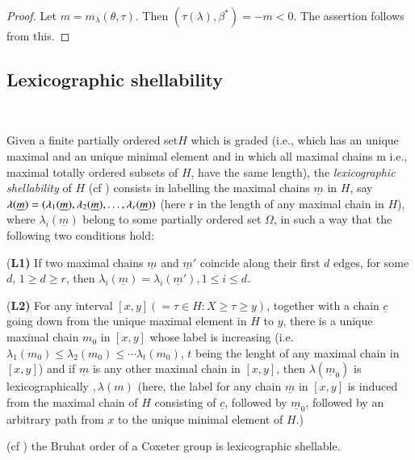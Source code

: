 \begin{proof}
Let $m=m_{\lambda}(\theta,\tau)$. Then $(\tau(\lambda), \beta^{*})= -m < 0$. The assertion follows from this.
\end{proof}

\setcounter{subsection}{5}
\subsection{Lexicographic shellability}\label{chap9-subsec-2.6}
~

\medskip
\noindent
Given a finite partially ordered set$H$ which is graded (i.e., which has an unique maximal and an unique minimal element and in which all maximal chains m i.e., maximal totally ordered subsets of $H$, have the same length), the
\textit{lexicographic shellability} of $H$ (cf \cite{chap9-keyB-W}) consists in labelling the maximal chains $\underline{m}$ in $H$, say $\lambda(\underline{m})= (\lambda_{1}(\underline{m}), \lambda_{2}(\underline{m}), \ldots, \break \lambda_{r}(\underline{m}))$ (here r in the length of any maximal chain in $H$), where $\lambda_{i}(\underline{m})$ belong to some partially ordered set $\Omega$, in such a way that the following two conditions hold:

\noindent
{(\bf L1)} If two maximal chains $\underline{m}$ and $\underline{m}'$ coincide along their first $d$ edges, for some $d$, $1 \geq d \geq r$, then $\lambda_{i}(\underline{m})= \lambda_{i}(\underline{m}'), 1 \leq i \leq d$.

\noindent
{(\bf L2)} For any interval $[x,y](= \tau \in H : X\geq \tau \geq y)$, together with a chain $\underline{c}$ going down from the unique maximal element in $H$ to $y$, there is a unique maximal chain $m_{0}$ in $[x,y]$ whose label is increasing (i.e. $\lambda_{1}(m_{0})\leq \lambda_{2}(m_{0})\leq \cdots \lambda_{t}(m_{0})$, $t$ being the lenght of any maximal chain in $[x,y]$) and if $\underline{m}$ is any other maximal chain in $[x,y]$, then $\lambda(\underline{m}_{0})$ is lexicographically $, \lambda(m)$ (here, the label for any chain $\underline{m}$ in $[x,y]$ is induced from the maximal chain of $H$ consisting of $\underline{c}$, followed by $\underline{m}_{0}$, followed by an arbitrary path from $x$ to the unique minimal element of $H$.) 

\setcounter{definition}{6}
\begin{secthm}\label{chap9-thm-2.7}
 {\rm(cf \cite{chap9-keyB-W})} the Bruhat order of a Coxeter group is lexicographic shellable.
\end{secthm}

